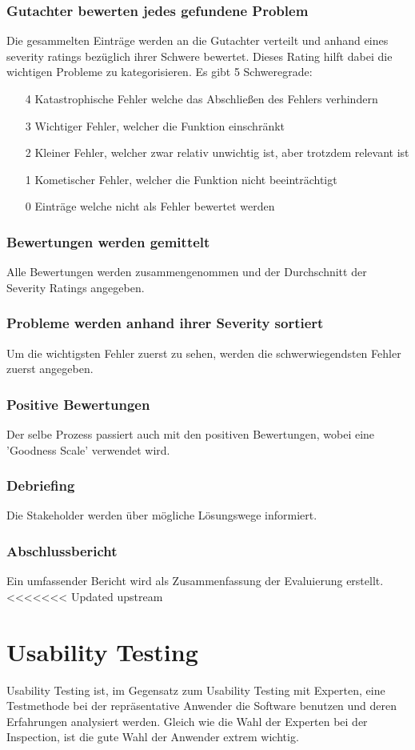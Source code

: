 \documentclass{article}
\begin{document}
	\subsubsection{Gutachter bewerten jedes gefundene Problem}
	Die gesammelten Einträge werden an die Gutachter verteilt und anhand eines severity ratings bezüglich ihrer Schwere bewertet. Dieses Rating hilft dabei die wichtigen Probleme zu kategorisieren. Es gibt 5 Schweregrade:
	\begin{enumerate}
		\item[4]{Katastrophische Fehler welche das Abschließen des Fehlers verhindern}
		\item[3]{Wichtiger Fehler, welcher die Funktion einschränkt}
		\item[2]{Kleiner Fehler, welcher zwar relativ unwichtig ist, aber trotzdem relevant ist}
		\item[1]{Kometischer Fehler, welcher die Funktion nicht beeinträchtigt}
		\item[0]{Einträge welche nicht als Fehler bewertet werden}
	\end{enumerate}
	\subsubsection{Bewertungen werden gemittelt}
	Alle Bewertungen werden zusammengenommen und der Durchschnitt der Severity Ratings angegeben.
	\subsubsection{Probleme werden anhand ihrer Severity sortiert}
	Um die wichtigsten Fehler zuerst zu sehen, werden die schwerwiegendsten Fehler zuerst angegeben.
	\subsubsection{Positive Bewertungen}
	Der selbe Prozess passiert auch mit den positiven Bewertungen, wobei eine 'Goodness Scale' verwendet wird.
	\subsubsection{Debriefing}
	Die Stakeholder werden über mögliche Lösungswege informiert.
	\subsubsection{Abschlussbericht}
	Ein umfassender Bericht wird als Zusammenfassung der Evaluierung erstellt.
<<<<<<< Updated upstream
	\section{Usability Testing}
	Usability Testing ist, im Gegensatz zum Usability Testing mit Experten, eine Testmethode bei der repräsentative Anwender die Software benutzen und deren Erfahrungen analysiert werden. Gleich wie die Wahl der Experten bei der Inspection, ist die gute Wahl der Anwender extrem wichtig.
\end{document}
